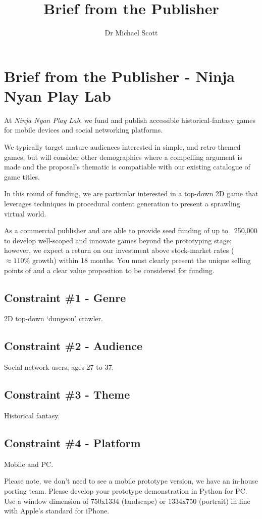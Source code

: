 \documentclass{../../fal_assignment}
\title{Brief from the Publisher}
\author{Dr Michael Scott}
\begin{document}
\section*{Brief from the Publisher - Ninja Nyan Play Lab}

At \textit{Ninja Nyan Play Lab}, we fund and publish accessible historical-fantasy games for mobile devices and social networking platforms. 

We typically target mature audiences interested in simple, and retro-themed games, but will consider other demographics where a compelling argument is made and the proposal's thematic is compatiable with our existing catalogue of game titles.

In this round of funding, we are particular interested in a top-down 2D game that leverages techniques in procedural content generation to present a sprawling virtual world.

As a commercial publisher and are able to provide seed funding of up to \textsterling~250,000 to develop well-scoped and innovate games beyond the prototyping stage; however, we expect a return on our investment above stock-market rates ($\approx 110\%$ growth) within 18 months. You must clearly present the unique selling points of and a clear value proposition to be considered for funding. 

\subsection*{Constraint \#1 - Genre}
2D top-down `dungeon' crawler.

\subsection*{Constraint \#2 - Audience}
Social network users, ages 27 to 37.

\subsection*{Constraint \#3 - Theme}
Historical fantasy.

\subsection*{Constraint \#4 - Platform}
Mobile and PC. 

Please note, we don't need to see a mobile prototype version, we have an in-house porting team. Please develop your prototype demonstration in Python for PC. Use a window dimension of 750x1334 (landscape) or 1334x750 (portrait) in line with Apple's standard for iPhone.
\end{document}
